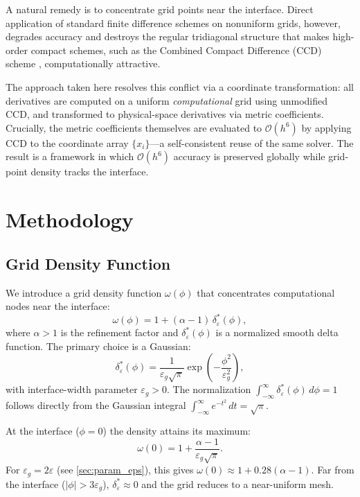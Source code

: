 \documentclass[10pt,a4paper,twocolumn]{article}
\newcommand{\Ord}[1]{\mathcal{O}(#1)}
\newcommand{\eps}{\varepsilon}
\begin{document}
A natural remedy is to concentrate grid points near the interface. Direct
application of standard finite difference schemes on nonuniform grids,
however, degrades accuracy and destroys the regular tridiagonal structure
that makes high-order compact schemes, such as the Combined Compact
Difference (CCD) scheme \cite{ChuFan1998}, computationally attractive.

The approach taken here resolves this conflict via a coordinate
transformation: all derivatives are computed on a uniform \emph{computational}
grid using unmodified CCD, and transformed to physical-space derivatives via
metric coefficients. Crucially, the metric coefficients themselves are
evaluated to $\Ord{h^6}$ by applying CCD to the coordinate array
$\{x_i\}$---a self-consistent reuse of the same solver. The result is a
framework in which $\Ord{h^6}$ accuracy is preserved globally while
grid-point density tracks the interface.

\section{Methodology}
\label{sec:method}

\subsection{Grid Density Function}
\label{sec:density}

We introduce a grid density function $\omega(\phi)$ that concentrates
computational nodes near the interface:
\begin{equation}
  \omega(\phi) = 1 + (\alpha - 1)\,\delta_\eps^*(\phi),
  \label{eq:omega}
\end{equation}
where $\alpha > 1$ is the refinement factor and $\delta_\eps^*(\phi)$ is a
normalized smooth delta function. The primary choice is a Gaussian:
\begin{equation}
  \delta_\eps^*(\phi)
  = \frac{1}{\eps_g\sqrt{\pi}}
    \exp\!\left(-\frac{\phi^2}{\eps_g^2}\right),
  \label{eq:delta_gauss}
\end{equation}
with interface-width parameter $\eps_g > 0$. The normalization
$\int_{-\infty}^{\infty}\delta_\eps^*(\phi)\,d\phi = 1$ follows directly
from the Gaussian integral $\int_{-\infty}^{\infty} e^{-t^2}\,dt =
\sqrt{\pi}$.

At the interface ($\phi = 0$) the density attains its maximum:
\begin{equation}
  \omega(0) = 1 + \frac{\alpha - 1}{\eps_g\sqrt{\pi}}.
  \label{eq:omega_peak}
\end{equation}
For $\eps_g = 2\eps$ (see \cref{sec:param_eps}), this gives
$\omega(0) \approx 1 + 0.28(\alpha - 1)$.  Far from the interface
($|\phi| > 3\eps_g$), $\delta_\eps^* \approx 0$ and the grid
reduces to a near-uniform mesh.
\end{document}
